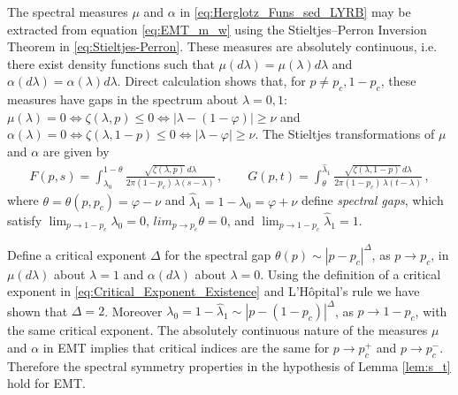 \documentclass[english,12pt,jmp,graphicx]{revtex4-1}
\begin{document}
The spectral measures $\mu$ and $\alpha$ in \eqref{eq:Herglotz_Funs_sed_LYRB}
may be extracted from equation \eqref{eq:EMT_m_w} using the Stieltjes--Perron
Inversion Theorem in \eqref{eq:Stieltjes-Perron}. These measures are
absolutely continuous, i.e. there exist density functions such that
$\mu(d\lambda)=\mu(\lambda)d\lambda$ and $\alpha(d\lambda)=\alpha(\lambda)d\lambda$. Direct calculation shows
that, for $p\neq p_c,1-p_c$, these measures have gaps in the spectrum
about $\lambda=0,1$: $\mu(\lambda)=0\iff\zeta(\lambda,p)\leq0\iff|\lambda-(1-\varphi)|\geq\nu$ and
$\alpha(\lambda)=0\iff\zeta(\lambda,1-p)\leq0\iff|\lambda-\varphi|\geq\nu$.     
The Stieltjes transformations of $\mu$ and $\alpha$ are given by 
%
\begin{align}\label{eq:EFM_Fs_Gt}
  F(p,s)%
      =\int_{\lambda_0}^{1-\theta}\frac{\sqrt{\zeta(\lambda,p)}\,d\lambda}{2\pi(1-p_c)\,\lambda(s-\lambda)}\,,
      \qquad 
  G(p,t)%
      =\int_{\theta}^{\hat{\lambda}_1}\frac{\sqrt{\zeta(\lambda,1-p)}\,d\lambda}{2\pi(1-p_c)\,\lambda(t-\lambda)}\,,
\end{align}
%
where $\theta=\theta(p,p_c)=\varphi-\nu$ and $\hat{\lambda}_1=1-\lambda_0=\varphi+\nu$ define \emph{spectral
  gaps}, which satisfy $\lim_{p\to1-p_c}\lambda_0=0$, $lim_{p\to p_c}\theta=0$,
and $\lim_{p\to1-p_c}\hat{\lambda}_1=1$. 

Define a critical exponent $\Delta$ for the spectral gap $\theta(p)\sim|p-p_c|^\Delta$,
as $p\to p_c$, in $\mu(d\lambda)$ about $\lambda=1$ and $\alpha(d\lambda)$ about $\lambda=0$. Using the
definition of a critical exponent in
\eqref{eq:Critical_Exponent_Existence} and L'H{\^o}pital's rule we have
shown that $\Delta=2$. Moreover $\lambda_0=1-\hat{\lambda}_1\sim|p-(1-p_c)|^\Delta$, as
$p\to1-p_c$, with the same critical exponent. The absolutely continuous
nature of the measures $\mu$ and $\alpha$ in EMT implies that critical indices
are the same for $p\to p_c^+$ and $p\to p_c^-$. Therefore the spectral
symmetry properties in the hypothesis of Lemma \ref{lem:s_t} hold for
EMT.  
\end{document}

